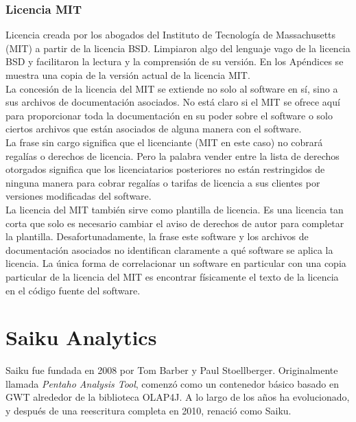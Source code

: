\begin{spacing}{1.5}
	\subsubsection{Licencia MIT}
	Licencia creada por los abogados del Instituto de Tecnología de Massachusetts (MIT) a partir de la licencia BSD. Limpiaron algo del lenguaje vago de la licencia BSD y facilitaron la lectura y la comprensión de su versión. En los Apéndices se muestra una copia de la versión actual de la licencia MIT.\\
	La concesión de la licencia del MIT se extiende no solo al software en sí, sino a sus archivos de documentación asociados. No está claro si el MIT se ofrece aquí para proporcionar toda la documentación en su poder sobre el software o solo ciertos archivos que están asociados de alguna manera con el software.\\
	La frase sin cargo significa que el licenciante (MIT en este caso) no cobrará regalías o derechos de licencia. Pero la palabra vender entre la lista de derechos otorgados significa que los licenciatarios posteriores no están restringidos de ninguna manera para cobrar regalías o tarifas de licencia a sus clientes por versiones modificadas del software.\\
	La licencia del MIT también sirve como plantilla de licencia. Es una licencia tan corta que solo es necesario cambiar el aviso de derechos de autor para completar la plantilla. Desafortunadamente, la frase este software y los archivos de documentación asociados no identifican claramente a qué software se aplica la licencia. La única forma de correlacionar un software en particular con una copia particular de la licencia del MIT es encontrar físicamente el texto de la licencia en el código fuente del software.\cite{chap2_MIT_license}\\
	
\section{Saiku Analytics}
	Saiku fue fundada en 2008 por Tom Barber y Paul Stoellberger. Originalmente llamada \textit{Pentaho Analysis Tool}, comenzó como un contenedor básico basado en GWT alrededor de la biblioteca OLAP4J. A lo largo de los años ha evolucionado, y después de una reescritura completa en 2010, renació como Saiku.
	

\end{spacing}
